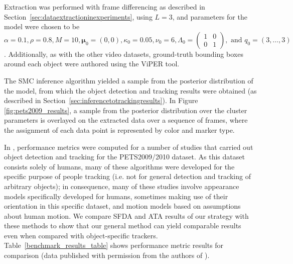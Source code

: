 \documentclass[twocolumn, final]{svjour3}
\begin{document}
Extraction was performed with frame differencing as described in Section~\ref{sec:dataextractioninexperiments}, using $L=3$, and parameters for the model were chosen to be $\alpha = 0.1, \rho = 0.8, M = 10, \boldsymbol{\mu}_{0} = (0,0), \kappa_{0} = 0.05, \nu_{0} = 6, \Lambda_{0} = \left( \begin{smallmatrix} 1&0\\ 0&1 \end{smallmatrix} \right), \text{ and } q_{0} = (3, \ldots, 3)$. Additionally, as with the other video datasets, ground-truth bounding boxes around each object were authored using the ViPER tool.

The SMC inference algorithm yielded a sample from the posterior distribution of the model, from which the object detection and tracking results were obtained (as described in Section~\ref{sec:inferencetotrackingresults}). In Figure \ref{fig:pets2009_results}, a sample from the posterior distribution over the cluster parameters is overlayed on the extracted data over a sequence of frames, where the assignment of each data point is represented by color and marker type.

In \cite{ellis_2010}, performance metrics were computed for a number of studies that carried out object detection and tracking for the PETS2009/2010 dataset. As this dataset consists solely of humans, many of these algorithms were developed for the specific purpose of people tracking (i.e. not for general detection and tracking of arbitrary objects); in consequence, many of these studies involve appearance models specifically developed for humans, sometimes making use of their orientation in this specific dataset, and motion models based on assumptions about human motion. We compare SFDA and ATA results of our strategy with these methods to show that our general method can yield comparable results even when compared with object-specific trackers. Table~\ref{benchmark_results_table} shows performance metric results for comparison (data published with permission from the authors of \cite{ellis_2010}).


\end{document}
